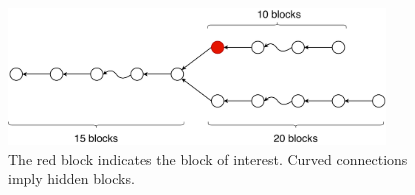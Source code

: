 \begin{figure}[hbt]
    \centering
    \includegraphics[width=10cm]{./images/proofs_25-10+20.pdf}
    \caption{The red block indicates the block of interest. Curved connections
    imply hidden blocks.}
    \label{figure:proofs_25-10+20}
\end{figure}
